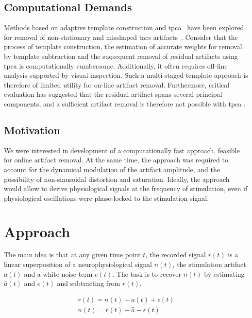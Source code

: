 \documentclass[a4paper]{article}
\begin{document}
\subsection{Computational Demands}

Methods based on adaptive template construction and \gls{tpca}~\citep{Niazy_2005} have been explored for removal of  non-stationary and misshaped \gls{tacs} artifacts~\citep{Helfrich_2014}.  Consider that the process of template construction, the estimation of accurate weights for removal by template subtraction and the suqsequent removal of residual artifacts using \gls{tpca} is computationally cumbersome. Additionally, it often requires off-line analysis supported by visual inspection.
Such a multi-staged template-approach is therefore of limited utility for on-line artifact removal. Furthermore, critical evaluation has suggested that the residual artifact spans several principal components, and a sufficient artifact removal is therefore not possible with \gls{tpca} \citep{Noury_2016}.

\subsection{Motivation}

We were interested in development of a computationally fast approach, feasible for online artifact removal. At the same time, the approach was required to account for the dynamical modulation of the artifact amplitude, and the possibility of non-sinusoidal distortion and saturation. Ideally, the approach would allow to derive physiological signals at the frequency of stimulation, even if physiological oscillations were phase-locked to the stimulation signal.

\section{Approach}

The main idea is that at any given time point $t$, the recorded signal $r(t)$ is a linear super\-position of a neurophysiological signal $n(t)$, the stimulation artifact $a(t)$ and a white noise term $e(t)$. The task is to recover $n(t)$ by estimating $\hat{a}(t)$ and $e(t)$ and subtracting from $r(t)$.

\begin{eqnarray}
    r(t) = n(t) + a(t) + \epsilon(t)\\
    n(t) = r(t) - \hat{a} - \epsilon(t)
\end{eqnarray}
\end{document}
